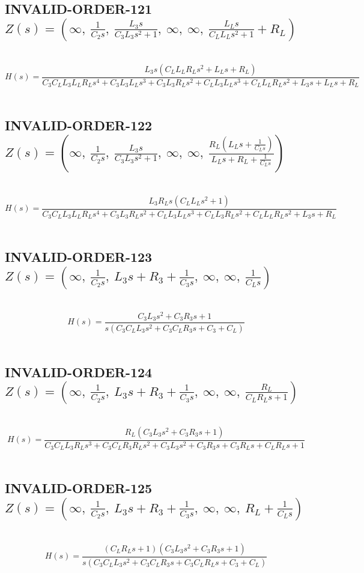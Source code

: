 \documentclass{article}
\begin{document}
\subsection{INVALID-ORDER-121 $Z(s) = \left( \infty, \  \frac{1}{C_{2} s}, \  \frac{L_{3} s}{C_{3} L_{3} s^{2} + 1}, \  \infty, \  \infty, \  \frac{L_{L} s}{C_{L} L_{L} s^{2} + 1} + R_{L}\right)$ } \ 
\textbf{\[H(s) = \frac{L_{3} s \left(C_{L} L_{L} R_{L} s^{2} + L_{L} s + R_{L}\right)}{C_{3} C_{L} L_{3} L_{L} R_{L} s^{4} + C_{3} L_{3} L_{L} s^{3} + C_{3} L_{3} R_{L} s^{2} + C_{L} L_{3} L_{L} s^{3} + C_{L} L_{L} R_{L} s^{2} + L_{3} s + L_{L} s + R_{L}}\] } \ 
\subsection{INVALID-ORDER-122 $Z(s) = \left( \infty, \  \frac{1}{C_{2} s}, \  \frac{L_{3} s}{C_{3} L_{3} s^{2} + 1}, \  \infty, \  \infty, \  \frac{R_{L} \left(L_{L} s + \frac{1}{C_{L} s}\right)}{L_{L} s + R_{L} + \frac{1}{C_{L} s}}\right)$ } \ 
\textbf{\[H(s) = \frac{L_{3} R_{L} s \left(C_{L} L_{L} s^{2} + 1\right)}{C_{3} C_{L} L_{3} L_{L} R_{L} s^{4} + C_{3} L_{3} R_{L} s^{2} + C_{L} L_{3} L_{L} s^{3} + C_{L} L_{3} R_{L} s^{2} + C_{L} L_{L} R_{L} s^{2} + L_{3} s + R_{L}}\] } \ 
\subsection{INVALID-ORDER-123 $Z(s) = \left( \infty, \  \frac{1}{C_{2} s}, \  L_{3} s + R_{3} + \frac{1}{C_{3} s}, \  \infty, \  \infty, \  \frac{1}{C_{L} s}\right)$ } \ 
\textbf{\[H(s) = \frac{C_{3} L_{3} s^{2} + C_{3} R_{3} s + 1}{s \left(C_{3} C_{L} L_{3} s^{2} + C_{3} C_{L} R_{3} s + C_{3} + C_{L}\right)}\] } \ 
\subsection{INVALID-ORDER-124 $Z(s) = \left( \infty, \  \frac{1}{C_{2} s}, \  L_{3} s + R_{3} + \frac{1}{C_{3} s}, \  \infty, \  \infty, \  \frac{R_{L}}{C_{L} R_{L} s + 1}\right)$ } \ 
\textbf{\[H(s) = \frac{R_{L} \left(C_{3} L_{3} s^{2} + C_{3} R_{3} s + 1\right)}{C_{3} C_{L} L_{3} R_{L} s^{3} + C_{3} C_{L} R_{3} R_{L} s^{2} + C_{3} L_{3} s^{2} + C_{3} R_{3} s + C_{3} R_{L} s + C_{L} R_{L} s + 1}\] } \ 
\subsection{INVALID-ORDER-125 $Z(s) = \left( \infty, \  \frac{1}{C_{2} s}, \  L_{3} s + R_{3} + \frac{1}{C_{3} s}, \  \infty, \  \infty, \  R_{L} + \frac{1}{C_{L} s}\right)$ } \ 
\textbf{\[H(s) = \frac{\left(C_{L} R_{L} s + 1\right) \left(C_{3} L_{3} s^{2} + C_{3} R_{3} s + 1\right)}{s \left(C_{3} C_{L} L_{3} s^{2} + C_{3} C_{L} R_{3} s + C_{3} C_{L} R_{L} s + C_{3} + C_{L}\right)}\] } \ 
\end{document}
